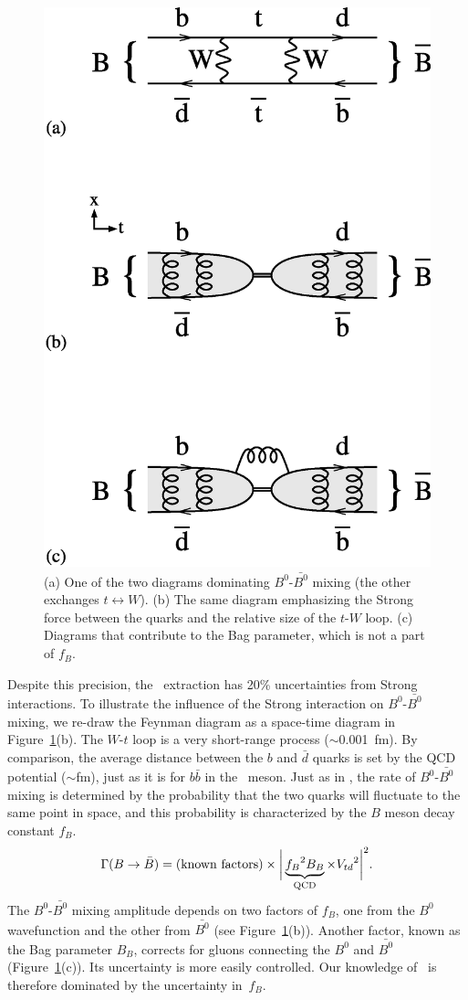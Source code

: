 \documentclass{cornell}
\begin{document}
\begin{figure}[p]
  \begin{center}
    \includegraphics[width=0.7\linewidth]{bmixing}
  \end{center}
  \caption[$B^0$-$\bar{B^0}$ mixing diagrams and the meaning of
  $f_B$]{\label{bmixing} (a) One of the two diagrams dominating
  $B^0$-$\bar{B^0}$ mixing (the other exchanges $t \leftrightarrow
  W$).  (b) The same diagram emphasizing the Strong force between the
  quarks and the relative size of the $t$-$W$ loop.  (c) Diagrams that
  contribute to the Bag parameter, which is not a part of $f_B$.}
\end{figure}

Despite this precision, the \vtd\ extraction has 20\% uncertainties
from Strong interactions.  To illustrate the influence of the Strong
interaction on $B^0$-$\bar{B^0}$ mixing, we re-draw the Feynman
diagram as a space-time diagram in Figure~\ref{bmixing}(b).  The
$W$-$t$ loop is a very short-range process ($\sim$0.001~fm).  By
comparison, the average distance between the $b$ and $\bar{d}$ quarks
is set by the QCD potential ($\sim$fm), just as it is for $b\bar{b}$
in the \ups\ meson.  Just as in \gee, the rate of $B^0$-$\bar{B^0}$
mixing is determined by the probability that the two quarks will
fluctuate to the same point in space, and this probability is
characterized by the $B$ meson decay constant $f_B$.
\begin{equation}
  \Gamma(B \to \bar{B}) = \mbox{(known factors)} \times \bigg|
  \underbrace{{f_B}^2 B_B}_{\mbox{\scriptsize QCD}} \times {V_{td}}^2 \bigg|^2
  \mbox{.}
\end{equation}
The $B^0$-$\bar{B^0}$ mixing amplitude depends on two factors of
$f_B$, one from the $B^0$ wavefunction and the other from $\bar{B^0}$
(see Figure~\ref{bmixing}(b)).  Another factor, known as the Bag
parameter $B_B$, corrects for gluons connecting the $B^0$ and
$\bar{B^0}$ (Figure~\ref{bmixing}(c)).  Its uncertainty is more easily
controlled.  Our knowledge of \vtd\ is therefore dominated by the
uncertainty in~$f_B$.
\end{document}
